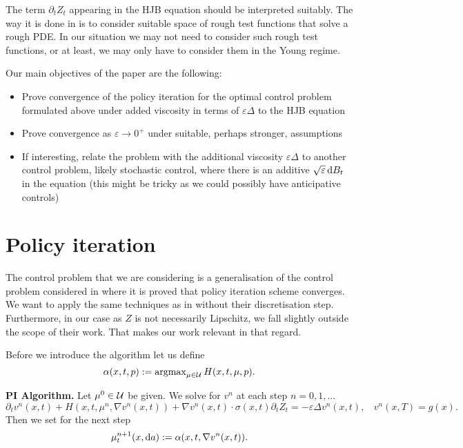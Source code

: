 \documentclass[./main.tex]{subfiles}
\begin{document}
\begin{remark}
The term $\partial_t Z_t$ appearing in the HJB equation should be interpreted suitably. The way it is done in \cite{Chakraborty_Honnappa_Tindel} is to consider suitable space of rough test functions that solve a rough PDE. In our situation we may not need to consider such rough test functions, or at least, we may only have to consider them in the Young regime. 
\end{remark}
    


Our main objectives of the paper are the following:
\begin{itemize}
    \item Prove convergence of  the policy iteration for  the optimal control problem formulated above under added viscosity in terms of $\varepsilon\Delta$ to the HJB equation
    \item Prove convergence as $\varepsilon\to 0^+$ under suitable, perhaps stronger, assumptions
    \item If interesting, relate the problem with the additional viscosity $\varepsilon\Delta$ to another control problem, likely stochastic control, where there is an additive $\sqrt{\varepsilon}\,\mathrm{d} B_t$ in the equation (this might be tricky as we could possibly have anticipative controls) 
\end{itemize}

 \section{Policy iteration}
The control problem that we are considering is a generalisation of the control problem considered in \cite{Tang_Tran_Zhang} where it is proved that policy iteration scheme converges. We want to apply the same techniques as in \cite{Tang_Tran_Zhang} without their discretisation step. Furthermore, in our case as $Z$ is not necessarily Lipschitz, we fall slightly outside the scope of their work. That makes our work relevant in that regard. 

Before we introduce the algorithm let us define
\[
\alpha(x,t,p):=\operatorname{argmax}_{\mu\in \mathcal U}H(x,t,\mu,p).
\]
\medskip 

\noindent \textbf{PI Algorithm.} Let $\mu^0\in\mathcal U$ be given. We solve for $v^n$ at each step $n=0,1,...$  
\[
\partial_t v^n(x,t)+H(x,t,\mu^n,\nabla v^n(x,t))+\nabla v^n(x,t)\cdot\sigma(x,t)\partial_t Z_t=-\varepsilon \Delta v^n(x,t), \ \ \ \ v^n(x,T)=g(x).
\]
Then we set for the next step
\[
\mu^{n+1}_t(x,\mathrm{d} a):=\alpha(x,t,\nabla v^n(x,t)).
\]
\end{document}
